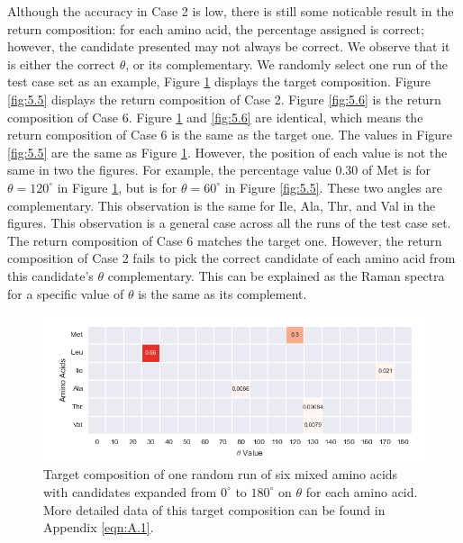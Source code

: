Although the accuracy in Case 2 is low, there is still some noticable result in the return composition: for each amino acid, the percentage assigned is correct; however, the candidate presented may not always be correct. We observe that it is either the correct $\theta$, or its complementary. We randomly select one run of the test case set as an example, Figure \ref{fig:5.4} displays the target composition. Figure \ref{fig:5.5} displays the return composition of Case 2. Figure \ref{fig:5.6} is the return composition of Case 6. Figure \ref{fig:5.4} and \ref{fig:5.6} are identical, which means the return composition of Case 6 is the same as the target one. The values in Figure \ref{fig:5.5} are the same as Figure \ref{fig:5.4}. However, the position of each value is not the same in two the figures. For example, the percentage value $0.30$ of Met is for $\theta = 120^{\circ}$ in Figure \ref{fig:5.4}, but is for $\theta = 60^{\circ}$ in Figure \ref{fig:5.5}. These two angles are complementary. This observation is the same for Ile, Ala, Thr, and Val in the figures. This observation is a general case across all the runs of the test case set. The return composition of Case 6 matches the target one. However, the return composition of Case 2 fails to pick the correct candidate of each amino acid from this candidate's $\theta$ complementary. This can be explained as the Raman spectra for a specific value of $\theta$ is the same as its complement. \\

\begin{figure}[!ht] 
\centering
\includegraphics[scale=0.7]{Figures/mixture_target_composition_for_one_run_theta_0_180.png}
\caption{Target composition of one random run of six mixed amino acids with candidates expanded from $0^{\circ}$ to $180^{\circ}$ on $\theta$ for each amino acid. More detailed data of this target composition can be found in Appendix \ref{eqn:A.1}. } 
\label{fig:5.4}
\end{figure}


